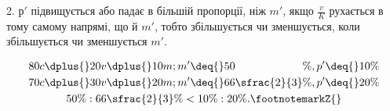 2. $р'$ підвищується або падає в більшій пропорції, ніж $m'$,
якщо $\frac{v}{K}$ рухається в тому самому напрямі, що й $m'$, тобто
збільшується чи зменшується, коли збільшується чи зменшується
$m'$.

\begin{gather*}
80 c \dplus{} 20 v \dplus{} 10 m; m' \deq{} 50\phantom{\sfrac{2}{3}}\%, p' \deq{} 10\% \\
70 c \dplus{} 30 v \dplus{} 20 m; m' \deq{} 66\sfrac{2}{3}\%, p' \deq{} 20\% \\
50\% : 66\sfrac{2}{3}\% < 10\% : 20\%.\text{\footnotemarkZ{}}
\end{gather*}


